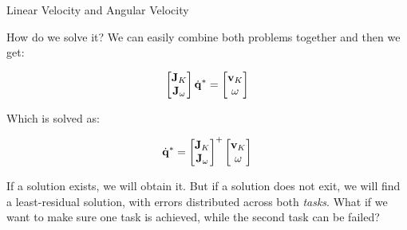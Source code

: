 \documentclass{beamer}
\begin{document}
\begin{frame}{Linear Velocity and Angular Velocity}
	\begin{flushleft}
		
		How do we solve it? We can easily combine both problems together and then we get:
		
		\begin{equation}
			\begin{bmatrix}
				\mathbf{J}_K \\ \mathbf{J}_\omega
			\end{bmatrix}
			 \dot{\mathbf{q}}^* = 
			 \begin{bmatrix}
			 	\mathbf{v}_K \\ \omega
			 \end{bmatrix}
		\end{equation}				
	
		Which is solved as:
		
		\begin{equation}
	\dot{\mathbf{q}}^* = 
	\begin{bmatrix}
		\mathbf{J}_K \\ \mathbf{J}_\omega
	\end{bmatrix}^+
	\begin{bmatrix}
		\mathbf{v}_K \\ \omega
	\end{bmatrix}
\end{equation}			
		
		If a solution exists, we will obtain it. But if a solution does not exit, we will find a least-residual solution, with errors distributed across both \emph{tasks}. What if we want to make sure one task is achieved, while the second task can be failed?
		
	\end{flushleft}
\end{frame}
\end{document}
